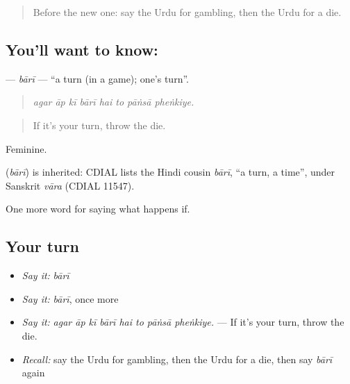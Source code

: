 \label{lesson:UR-C533-bari}



\begin{quote}
Before the new one: say the Urdu for gambling, then the Urdu for a die.
\end{quote}

\subsection*{You'll want to know: }
\textbf{} — \emph{bārī} — \textquotedblleft{}a turn (in a game); one's turn\textquotedblright{}.

\begin{quote}
       
\end{quote}

\begin{quote}
\emph{agar āp kī bārī hai to pāṅsā pheṅkiye.}
\end{quote}

\begin{quote}
If it's your turn, throw the die.
\end{quote}

Feminine.

\begin{cousinweb}
\textbf{} (\emph{bārī}) is inherited: CDIAL lists the Hindi cousin \emph{bārī}, \textquotedblleft{}a turn, a time\textquotedblright{}, under Sanskrit \emph{vāra} (CDIAL 11547).
\end{cousinweb}

\begin{grammarlens}[title={What you've built}]
One more word for saying what happens if.
\end{grammarlens}

\subsection*{Your turn}
\begin{itemize}
\raggedright
  \item \emph{Say it:} \emph{bārī}
  \item \emph{Say it:} \emph{bārī}, once more
  \item \emph{Say it:} \emph{agar āp kī bārī hai to pāṅsā pheṅkiye.} — If it's your turn, throw the die.
  \item \emph{Recall:} say the Urdu for gambling, then the Urdu for a die, then say \emph{bārī} again
\end{itemize}

